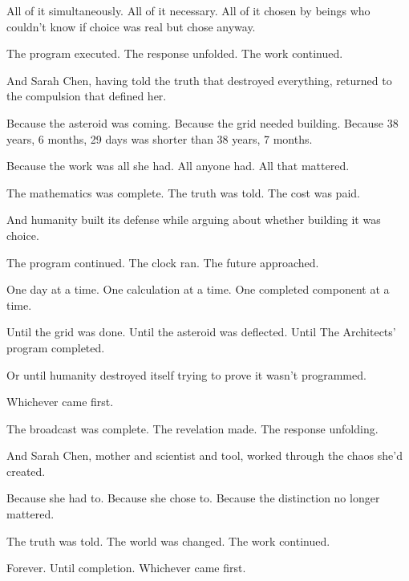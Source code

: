 All of it simultaneously. All of it necessary. All of it chosen by beings who couldn't know if choice was real but chose anyway.

The program executed. The response unfolded. The work continued.

And Sarah Chen, having told the truth that destroyed everything, returned to the compulsion that defined her.

Because the asteroid was coming. Because the grid needed building. Because 38 years, 6 months, 29 days was shorter than 38 years, 7 months.

Because the work was all she had. All anyone had. All that mattered.

The mathematics was complete. The truth was told. The cost was paid.

And humanity built its defense while arguing about whether building it was choice.

The program continued. The clock ran. The future approached.

One day at a time. One calculation at a time. One completed component at a time.

Until the grid was done. Until the asteroid was deflected. Until The Architects' program completed.

Or until humanity destroyed itself trying to prove it wasn't programmed.

Whichever came first.

The broadcast was complete. The revelation made. The response unfolding.

And Sarah Chen, mother and scientist and tool, worked through the chaos she'd created.

Because she had to. Because she chose to. Because the distinction no longer mattered.

The truth was told. The world was changed. The work continued.

Forever. Until completion. Whichever came first.

